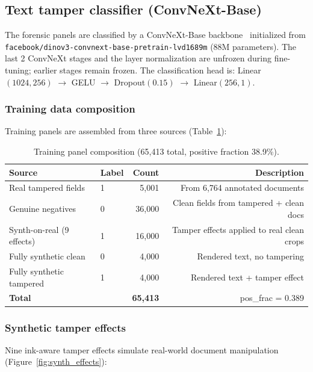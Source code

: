 \documentclass[11pt,a4paper]{article}
\begin{document}
\subsection{Text tamper classifier (ConvNeXt-Base)}

The forensic panels are classified by a ConvNeXt-Base backbone~\cite{convnextv2} initialized from
{\small\texttt{facebook/dinov3-convnext-base-pretrain-lvd1689m}} (88M parameters).
The last 2 ConvNeXt stages and the layer normalization are unfrozen during
fine-tuning; earlier stages remain frozen.
The classification head is:
Linear$(1024, 256)$ $\to$ GELU $\to$ Dropout$(0.15)$ $\to$ Linear$(256, 1)$.

\subsubsection{Training data composition}

Training panels are assembled from three sources (Table~\ref{tab:panels}):

\begin{table}[H]
  \centering
  \small
  \caption{Training panel composition (65{,}413 total, positive fraction 38.9\%).}
  \label{tab:panels}
  \begin{tabular}{llrr}
    \toprule
    Source & Label & Count & Description \\
    \midrule
    Real tampered fields       & 1 & 5{,}001 & From 6{,}764 annotated documents \\
    Genuine negatives          & 0 & 36{,}000 & Clean fields from tampered + clean docs \\
    Synth-on-real (9 effects)  & 1 & 16{,}000 & Tamper effects applied to real clean crops \\
    Fully synthetic clean      & 0 & 4{,}000  & Rendered text, no tampering \\
    Fully synthetic tampered   & 1 & 4{,}000  & Rendered text + tamper effect \\
    \midrule
    \textbf{Total}             &   & \textbf{65{,}413} & pos\_frac = 0.389 \\
    \bottomrule
  \end{tabular}
\end{table}

\subsubsection{Synthetic tamper effects}

Nine ink-aware tamper effects simulate real-world document manipulation
(Figure~\ref{fig:synth_effects}):
\end{document}
